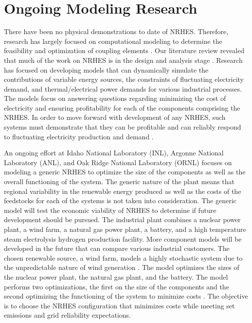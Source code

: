\documentclass[12pt]{UIdahoMastersThesis}
\begin{document}
\section{Ongoing Modeling Research}
There have been no physical demonstrations to date of NRHES. Therefore, research has largely focused on computational modeling to determine the feasibility and optimization of coupling elements \cite{Rabiti2015, Boardman2013, Shropshire2012}. Our literature review revealed that much of the work on NRHES is in the design and analysis stage \cite{Epiney2016, Boardman2013, Shropshire2012}. Research has focused on developing models that can dynamically simulate the contributions of variable energy sources, the constraints of fluctuating electricity demand, and thermal/electrical power demands for various industrial processes. The models focus on answering questions regarding minimizing the cost of electricity and ensuring profitability for each of the components comprising the NRHES. In order to move forward with development of any NRHES, such systems must demonstrate that they can be profitable and can reliably respond to fluctuating electricity production and demand \cite{Rabiti2015}.

An ongoing effort at Idaho National Laboratory (INL), Argonne National Laboratory (ANL), and Oak Ridge National Laboratory (ORNL) focuses on modeling a generic NRHES to optimize the size of the components as well as the overall functioning of the system. The generic nature of the plant means that regional variability in the renewable energy produced as well as the costs of the feedstocks for each of the systems is not taken into consideration. The generic model will test the economic viability of NRHES to determine if future development should be pursued. The industrial plant combines a nuclear power plant, a wind farm, a natural gas power plant, a battery, and a high temperature steam electrolysis hydrogen production facility. More component models will be developed in the future that can compare various industrial customers\cite{Harrison2016}. The chosen renewable source, a wind farm, models a highly stochastic system due to the unpredictable nature of wind generation \cite{Chen2016_wind}. The model optimizes the sizes of the nuclear power plant, the natural gas plant, and the battery. The model performs two optimizations, the first on the size of the components and the second optimizing the functioning of the system to minimize costs \cite{redfoot_rabiti_2018}. The objective is to choose the NRHES configuration that minimizes costs while meeting set emissions and grid reliability expectations.
\end{document}
